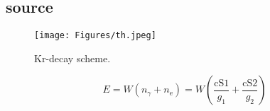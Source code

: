 
\FloatBarrier
\subsection{source}
\label{ssec:source}
\FloatBarrier



















\begin{figure}
    \centering
    \texttt{[image: Figures/th.jpeg]}  %
    \caption[Decay Scheme Krypton]{Kr-decay scheme\cite{kr_scheme}.}
    \label{fig:test}
\end{figure}


\begin{equation}
    E = W \left( n_\gamma + n_\mathrm{e} \right) = W \left( \frac{\mathrm{cS1}}{g_1} + \frac{\mathrm{cS2}}{g_2} \right)
    \label{eq:test}
\end{equation}


